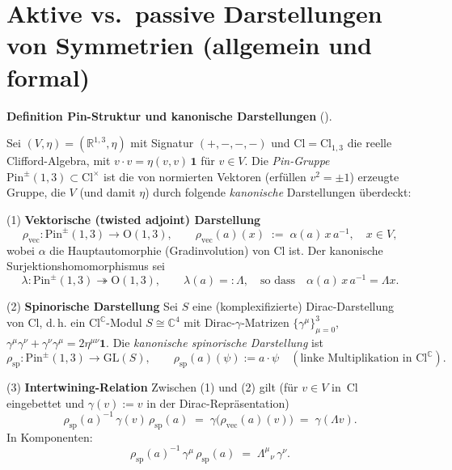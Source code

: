\documentclass[10pt, letterpaper]{article}
\newcommand{\C}{\mathbb{C}}
\newcommand{\Cl}{\mathrm{Cl}}
\newcommand{\GL}{\mathrm{GL}}
\newcommand{\Pin}{\mathrm{Pin}}
\newcommand{\Ogroup}{\mathrm{O}}
\newcommand{\CustomHeading}[3]{%
  \par\medskip\noindent%
  \textbf{#1 #2} \textnormal{(#3)}.\enskip%
}
\newenvironment{DEF}[2]{\begin{unitbox}\CustomHeading{Definition}{#1}{#2}}{\end{unitbox}}
\begin{document}
\pagebreak

\section{Aktive vs.\ passive Darstellungen von Symmetrien (allgemein und formal)}

\begin{DEF}{Pin-Struktur und kanonische Darstellungen}{}
Sei $(V,\eta)=(\mathbb R^{1,3},\eta)$ mit Signatur $(+,-,-,-)$ und $\Cl=\Cl_{1,3}$ die reelle
Clifford-Algebra, mit $v\cdot v=\eta(v,v)\,\mathbf 1$ für $v\in V$.
Die \emph{Pin-Gruppe} $\Pin^{\pm}(1,3)\subset \Cl^\times$ ist die von normierten Vektoren
(erfüllen $v^2=\pm 1$) erzeugte Gruppe, die $V$ (und damit $\eta$) durch folgende
\emph{kanonische} Darstellungen überdeckt:

\smallskip
\noindent
(1) \textbf{Vektorische (twisted adjoint) Darstellung}
\[
\rho_{\mathrm{vec}}:\Pin^{\pm}(1,3)\to \Ogroup(1,3),\qquad
\rho_{\mathrm{vec}}(a)(x)\;:=\;\alpha(a)\,x\,a^{-1},\quad x\in V,
\]
wobei $\alpha$ die Hauptautomorphie (Gradinvolution) von $\Cl$ ist.
Der kanonische Surjektionshomomorphismus sei
\[
\lambda:\Pin^{\pm}(1,3)\twoheadrightarrow \Ogroup(1,3),\qquad
\lambda(a)=:\Lambda,\quad\text{so dass}\quad
\alpha(a)\,x\,a^{-1}=\Lambda x.
\]

\noindent
(2) \textbf{Spinorische Darstellung}
Sei $S$ eine (komplexifizierte) Dirac-Darstellung von $\Cl$, d.\,h. ein $\Cl^\C$-Modul
$S\cong\C^4$ mit Dirac-$\gamma$-Matrizen $\{\gamma^\mu\}_{\mu=0}^3$,
$\gamma^\mu\gamma^\nu+\gamma^\nu\gamma^\mu=2\eta^{\mu\nu}\mathbf 1$.
Die \emph{kanonische spinorische Darstellung} ist
\[
\rho_{\mathrm{sp}}:\Pin^{\pm}(1,3)\to \GL(S),\qquad
\rho_{\mathrm{sp}}(a)(\psi):=a\cdot \psi \quad(\text{linke Multiplikation in } \Cl^\C).
\]

\noindent
(3) \textbf{Intertwining-Relation}
Zwischen (1) und (2) gilt (für $v\in V$ in $\,\Cl\,$ eingebettet und $\gamma(v):=v$ in der
Dirac-Repräsentation)
\begin{equation}\label{eq:intertwine}
\rho_{\mathrm{sp}}(a)^{-1}\,\gamma(v)\,\rho_{\mathrm{sp}}(a)\;=\;\gamma\!\big(\rho_{\mathrm{vec}}(a)(v)\big)
\;=\;\gamma(\Lambda v).
\end{equation}
In Komponenten:
\begin{equation}\label{eq:gamma-cov}
\rho_{\mathrm{sp}}(a)^{-1}\,\gamma^\mu\,\rho_{\mathrm{sp}}(a)\;=\;\Lambda^\mu{}_{\nu}\,\gamma^\nu.
\end{equation}
\end{DEF}
\end{document}
